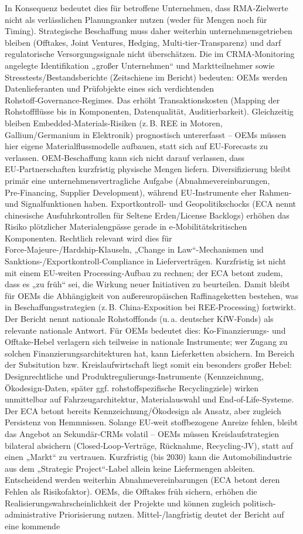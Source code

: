 \documentclass[12pt,a4paper,oneside]{book} %
\begin{document}
In Konsequenz bedeutet dies für betroffene Unternehmen, dass RMA‑Zielwerte nicht als verlässlichen Planungsanker nutzen (weder für Mengen noch für Timing). Strategische Beschaffung muss daher weiterhin unternehmensgetrieben bleiben (Offtakes, Joint Ventures, Hedging, Multi‑tier‑Transparenz) und darf regulatorische Versorgungssignale nicht überschätzen. Die im CRMA‑Monitoring angelegte Identifikation „großer Unternehmen“ und Marktteilnehmer sowie Stresstests/Bestandsberichte (Zeitschiene im Bericht) bedeuten: OEMs werden Datenlieferanten und Prüfobjekte eines sich verdichtenden Rohstoff‑Governance‑Regimes. Das erhöht Transaktionskosten (Mapping der Rohstoffflüsse bis in Komponenten, Datenqualität, Auditierbarkeit). Gleichzeitig bleiben Embedded‑Materials‑Risiken (z. B. REE in Motoren, Gallium/Germanium in Elektronik) prognostisch untererfasst – OEMs müssen hier eigene Materialflussmodelle aufbauen, statt sich auf EU‑Forecasts zu verlassen. OEM‑Beschaffung kann sich nicht darauf verlassen, dass EU‑Partnerschaften kurzfristig physische Mengen liefern. Diversifizierung bleibt primär eine unternehmensvertragliche Aufgabe (Abnahmevereinbarungen, Pre‑Financing, Supplier Development), während EU‑Instrumente eher Rahmen- und Signalfunktionen haben. Exportkontroll- und Geopolitikschocks (ECA nennt chinesische Ausfuhrkontrollen für Seltene Erden/License Backlogs) erhöhen das Risiko plötzlicher Materialengpässe gerade in e‑Mobilitätskritischen Komponenten. Rechtlich relevant wird dies für Force‑Majeure‑/Hardship‑Klauseln, „Change in Law“-Mechanismen und Sanktions-/Exportkontroll-Compliance in Lieferverträgen. Kurzfristig ist nicht mit einem EU‑weiten Processing‑Aufbau zu rechnen; der ECA betont zudem, dass es „zu früh“ sei, die Wirkung neuer Initiativen zu beurteilen. Damit bleibt für OEMs die Abhängigkeit von außereuropäischen Raffinageketten bestehen, was in Beschaffungsstrategien (z. B. China‑Exposition bei REE‑Processing) fortwirkt. Der Bericht nennt nationale Rohstofffonds (u. a. deutscher KfW‑Fonds) als relevante nationale Antwort. Für OEMs bedeutet dies: Ko-Finanzierungs- und Offtake‑Hebel verlagern sich teilweise in nationale Instrumente; wer Zugang zu solchen Finanzierungsarchitekturen hat, kann Lieferketten absichern. Im Bereich der Subsitution bzw. Kreislaufwirtschaft liegt somit ein besonders großer Hebel: Designrechtliche und Produktregulierungs‑Instrumente (Kennzeichnung, Ökodesign‑Daten, später ggf. rohstoffspezifische Recyclingziele) wirken unmittelbar auf Fahrzeugarchitektur, Materialauswahl und End‑of‑Life‑Systeme. Der ECA betont bereits Kennzeichnung/Ökodesign als Ansatz, aber zugleich Persistenz von Hemmnissen. Solange EU‑weit stoffbezogene Anreize fehlen, bleibt das Angebot an Sekundär‑CRMs volatil – OEMs müssen Kreislaufstrategien bilateral absichern (Closed‑Loop‑Verträge, Rücknahme, Recycling‑JV), statt auf einen „Markt“ zu vertrauen. Kurzfristig (bis 2030) kann die Automobilindustrie aus dem „Strategic Project“-Label allein keine Liefermengen ableiten. Entscheidend werden weiterhin Abnahmevereinbarungen (ECA betont deren Fehlen als Risikofaktor). OEMs, die Offtakes früh sichern, erhöhen die Realisierungswahrscheinlichkeit der Projekte und können zugleich politisch-administrative Priorisierung nutzen. Mittel-/langfristig deutet der Bericht auf eine kommende 
\end{document}

